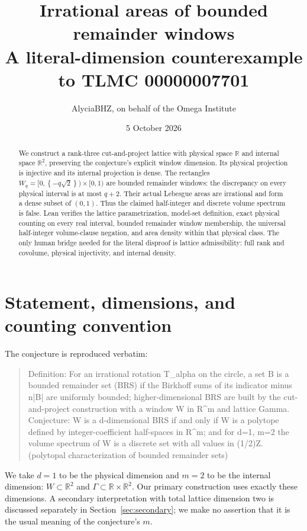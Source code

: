 \documentclass[11pt]{article}
\title{Irrational areas of bounded remainder windows\\A literal-dimension counterexample to TLMC 00000007701}
\author{AlyciaBHZ, on behalf of the Omega Institute}
\date{5 October 2026}
\newcommand{\fr}[1]{\left\{#1\right\}}
\newcommand{\R}{\mathbb R}
\begin{document}
\maketitle
\begin{abstract}
We construct a rank-three cut-and-project lattice with physical space
$\R$ and internal space $\R^2$, preserving the conjecture's explicit
window dimension. Its physical projection is injective and its internal
projection is dense. The rectangles
$W_q=[0,\fr{-q\sqrt2})\times[0,1)$ are bounded remainder windows:
the discrepancy on every physical interval is at most $q+2$.
Their actual Lebesgue areas are irrational and form a dense subset of
$(0,1)$. Thus the claimed half-integer and discrete volume spectrum is
false. Lean verifies the lattice parametrization, model-set definition,
exact physical counting on every real interval, bounded remainder
window membership, the universal half-integer volume-clause negation,
and area density within that physical class. The only human bridge
needed for the literal disproof is lattice admissibility: full rank and
covolume, physical injectivity, and internal density.
\end{abstract}

\section{Statement, dimensions, and counting convention}
The conjecture is reproduced verbatim:
\begin{quote}
Definition: For an irrational rotation T\_alpha on the circle, a set B is a bounded remainder set (BRS) if the Birkhoff sums of its indicator minus n|B| are uniformly bounded; higher-dimensional BRS are built by the cut-and-project construction with a window W in R\^{}m and lattice Gamma. Conjecture: W is a d-dimensional BRS if and only if W is a polytope defined by integer-coefficient half-spaces in R\^{}m; and for d=1, m=2 the volume spectrum of W is a discrete set with all values in (1/2)Z. (polytopal characterization of bounded remainder sets)
\end{quote}
We take $d=1$ to be the physical dimension and $m=2$ to be the
internal dimension: $W\subset\R^2$ and $\Gamma\subset\R\times\R^2$.
Our primary construction uses exactly these dimensions. A secondary
interpretation with total lattice dimension two is discussed separately
in Section~\ref{sec:secondary}; we make no assertion that it is the
usual meaning of the conjecture's $m$.
\end{document}
